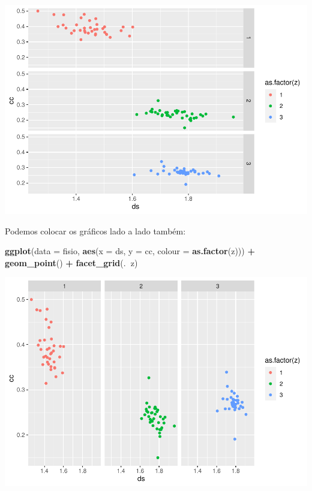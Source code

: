 \documentclass[
]{book}
\newenvironment{Shaded}{\begin{snugshade}}{\end{snugshade}}
\newcommand{\DataTypeTok}[1]{\textcolor[rgb]{0.13,0.29,0.53}{#1}}
\newcommand{\KeywordTok}[1]{\textcolor[rgb]{0.13,0.29,0.53}{\textbf{#1}}}
\newcommand{\NormalTok}[1]{#1}
\newcommand{\OperatorTok}[1]{\textcolor[rgb]{0.81,0.36,0.00}{\textbf{#1}}}
\newcommand{\StringTok}[1]{\textcolor[rgb]{0.31,0.60,0.02}{#1}}
\begin{document}
\includegraphics{TudodoR_files/figure-latex/unnamed-chunk-220-1.pdf}

Podemos colocar os gráficos lado a lado também:

\begin{Shaded}
\begin{Highlighting}[]
\KeywordTok{ggplot}\NormalTok{(}\DataTypeTok{data =}\NormalTok{ fisio, }\KeywordTok{aes}\NormalTok{(}\DataTypeTok{x =}\NormalTok{ ds, }\DataTypeTok{y =}\NormalTok{ cc, }\DataTypeTok{colour =} \KeywordTok{as.factor}\NormalTok{(z))) }\OperatorTok{+}
\StringTok{  }\KeywordTok{geom_point}\NormalTok{() }\OperatorTok{+}
\StringTok{  }\KeywordTok{facet_grid}\NormalTok{(.}\OperatorTok{~}\NormalTok{z)}
\end{Highlighting}
\end{Shaded}

\includegraphics{TudodoR_files/figure-latex/unnamed-chunk-221-1.pdf}
\end{document}

